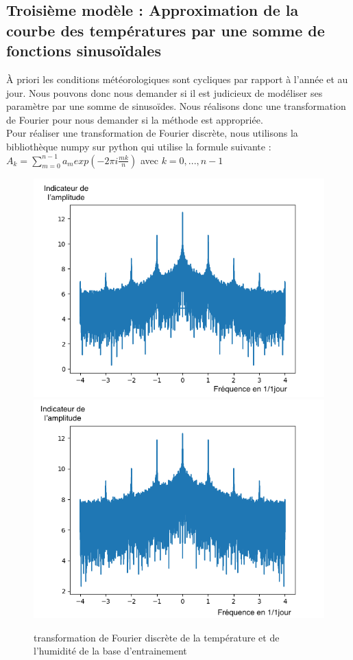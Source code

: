 \documentclass[11pt,a4paper]{article}
\begin{document}
\subsection{Troisième modèle : Approximation de la courbe des températures par une somme de fonctions sinusoïdales}
À priori les conditions météorologiques sont cycliques par rapport à l'année et au jour. Nous pouvons donc nous demander si il est judicieux de modéliser ses paramètre par une somme de sinusoïdes. Nous réalisons donc une
transformation de Fourier pour nous demander si la méthode est appropriée. \\
Pour réaliser une transformation de Fourier discrète, nous utilisons la bibliothèque numpy sur python qui utilise la formule suivante :  \\
$ A_{k}  = \displaystyle { \sum_{m=0}^{n-1}} a_{m} exp(-2\pi i \frac{mk}{n} ) $ avec $k = 0, ... , n-1 $   \\ 
\vspace {0.3cm}
\begin{figure} [!h]
\centering
\includegraphics[width=0.48 \textwidth]{./imagesTIPE/fftT.png}\quad
\includegraphics[width=0.48 \textwidth]{./imagesTIPE/fftH.png}
\caption{\label{fig:190101Lolita} transformation de Fourier discrète de la température et de l'humidité de la base d'entrainement}
\end{figure}
\end{document}
